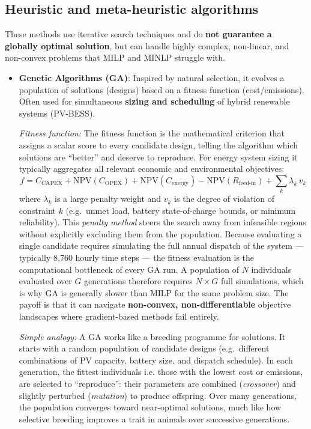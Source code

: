 \documentclass[11pt,a4paper]{report}
\begin{document}
\subsection{Heuristic and meta-heuristic algorithms}
These methods use iterative search techniques and do \textbf{not guarantee a globally optimal solution}, but can handle highly complex, non-linear, and non-convex problems that MILP and MINLP struggle with.

\begin{itemize}
    \item \textbf{Genetic Algorithms (GA)}: Inspired by natural selection, it evolves a population of solutions (designs) based on a fitness function (cost/emissions). Often used for simultaneous \textbf{sizing and scheduling} of hybrid renewable systems (PV-BESS).

    \textit{Fitness function:} The fitness function is the mathematical criterion that assigns a scalar score to every candidate design, telling the algorithm which solutions are ``better'' and deserve to reproduce. For energy system sizing it typically aggregates all relevant economic and environmental objectives:
    \begin{equation*}
        f = C_{\text{CAPEX}} + \text{NPV}(C_{\text{OPEX}}) + \text{NPV}(C_{\text{energy}}) - \text{NPV}(R_{\text{feed-in}}) + \sum_k \lambda_k \, v_k
    \end{equation*}
    where $\lambda_k$ is a large penalty weight and $v_k$ is the degree of violation of constraint $k$ (e.g.\ unmet load, battery state-of-charge bounds, or minimum reliability). This \textit{penalty method} steers the search away from infeasible regions without explicitly excluding them from the population. Because evaluating a single candidate requires simulating the full annual dispatch of the system --- typically 8{,}760 hourly time steps --- the fitness evaluation is the computational bottleneck of every GA run. A population of $N$ individuals evaluated over $G$ generations therefore requires $N \times G$ full simulations, which is why GA is generally slower than MILP for the same problem size. The payoff is that it can navigate \textbf{non-convex, non-differentiable} objective landscapes where gradient-based methods fail entirely.

    \textit{Simple analogy:} A GA works like a breeding programme for solutions. It starts with a random population of candidate designs (e.g.\ different combinations of PV capacity, battery size, and dispatch schedule). In each generation, the fittest individuals i.e. those with the lowest cost or emissions, are selected to ``reproduce'': their parameters are combined (\textit{crossover}) and slightly perturbed (\textit{mutation}) to produce offspring. Over many generations, the population converges toward near-optimal solutions, much like how selective breeding improves a trait in animals over successive generations.


\end{itemize}
\end{document}
